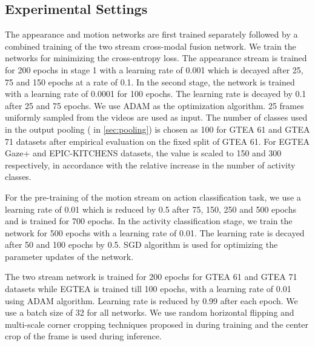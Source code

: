 \documentclass[10pt,twocolumn,letterpaper]{article}
\begin{document}
\begin{matrix*}[r]
\subsection{Experimental Settings}
	The appearance and motion networks are first trained separately followed by a combined training of the two stream cross-modal fusion network.	We train the networks for minimizing the cross-entropy loss. The appearance stream is trained for 200 epochs in stage 1 with a learning rate of 0.001 which is decayed after 25, 75 and 150 epochs at a rate of 0.1. In the second stage, the network is trained with a learning rate of 0.0001 for 100 epochs. The learning rate is decayed by 0.1 after 25 and 75 epochs. We use ADAM as the optimization algorithm. 25 frames uniformly sampled from the videos are used as input. The number of classes used in the output pooling ( in \ref{sec:pooling}) is chosen as 100 for GTEA 61 and GTEA 71 datasets after empirical evaluation on the fixed split of GTEA 61. For EGTEA Gaze+ and EPIC-KITCHENS datasets, the value is scaled to 150 and 300 respectively, in accordance with the relative increase in the number of activity classes.

	For the pre-training of the motion stream on action classification task, we use a learning rate of 0.01 which is reduced by 0.5 after 75, 150, 250 and 500 epochs and is trained for 700 epochs. In the activity classification stage, we train the network for 500 epochs with a learning rate of 0.01. The learning rate is decayed after 50 and 100 epochs by 0.5. SGD algorithm is used for optimizing the parameter updates of the network.
	
	The two stream network is trained for 200 epochs for GTEA 61 and GTEA 71 datasets while EGTEA is trained till 100 epochs, with a learning rate of 0.01 using ADAM algorithm. Learning rate is reduced by 0.99 after each epoch. We use a batch size of 32 for all networks. We use random horizontal flipping and multi-scale corner cropping techniques proposed in \cite{TSN2016ECCV} during training and the center crop of the frame is used during inference.
	
	
	

\end{matrix*}
\end{document}
